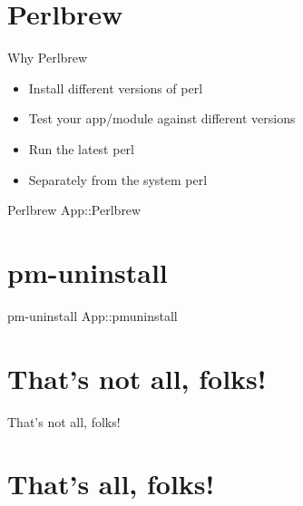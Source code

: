 \documentclass[
	mode=present,
	style=paintings,
	size=14pt,
	paper=screen
]{powerdot}
\begin{document}
\section{Perlbrew}
\begin{slide}{Why Perlbrew}
        \begin{itemize}
          \item Install different versions of perl \par \pause
          \item Test your app/module against different versions \par \pause
          \item Run the latest perl \par \pause
          \item Separately from the system perl
        \end{itemize}
\end{slide}
\begin{slide}{Perlbrew}
	App::Perlbrew
\end{slide}
\section{pm-uninstall}
\begin{slide}{pm-uninstall}
	App::pmuninstall\par \pause
\end{slide}
\section{That's not all, folks!}
\begin{slide}{That's not all, folks!}
	\par
	\par
	\par
	\par
	\par
	\par
	\par
	\par
\end{slide}
\section {That's all, folks!}
\end{document}
